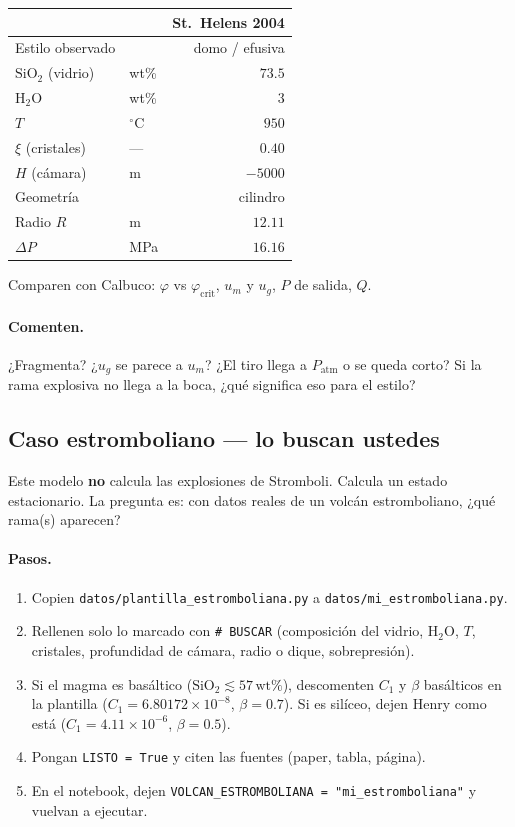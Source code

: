 \documentclass[11pt,a4paper]{article}
\begin{document}
\begin{center}
\small
\begin{tabular}{@{}llr@{}}
\toprule
& & St.\ Helens 2004 \\
\midrule
Estilo observado & & domo / efusiva \\
$\mathrm{SiO}_2$ (vidrio) & wt\% & $73.5$ \\
$\mathrm{H}_2\mathrm{O}$ & wt\% & $3$ \\
$T$ & $^\circ\mathrm{C}$ & $950$ \\
$\xi$ (cristales) & --- & $0.40$ \\
$H$ (cámara) & m & $-5000$ \\
Geometría & & cilindro \\
Radio $R$ & m & $12.11$ \\
$\Delta P$ & MPa & $16.16$ \\
\bottomrule
\end{tabular}
\end{center}

Comparen con Calbuco: $\varphi$ vs $\varphi_{\mathrm{crit}}$,
$u_m$ y $u_g$, $P$ de salida, $Q$.

\paragraph{Comenten.}
¿Fragmenta? ¿$u_g$ se parece a $u_m$?
¿El tiro llega a $P_{\mathrm{atm}}$ o se queda corto?
Si la rama explosiva no llega a la boca, ¿qué significa eso para el estilo?

\subsection{Caso estromboliano --- lo buscan ustedes}

Este modelo \textbf{no} calcula las explosiones de Stromboli.
Calcula un estado estacionario. La pregunta es: con datos reales de un
volcán estromboliano, ¿qué rama(s) aparecen?

\paragraph{Pasos.}
\begin{enumerate}
  \item Copien \texttt{datos/plantilla\_estromboliana.py} a
        \texttt{datos/mi\_estromboliana.py}.
  \item Rellenen solo lo marcado con \texttt{\# BUSCAR}
        (composición del vidrio, $\mathrm{H}_2\mathrm{O}$, $T$, cristales,
        profundidad de cámara, radio o dique, sobrepresión).
  \item Si el magma es basáltico ($\mathrm{SiO}_2\lesssim 57\,\mathrm{wt\%}$),
        descomenten $C_1$ y $\beta$ basálticos en la plantilla
        ($C_1=6.80172\times 10^{-8}$, $\beta=0.7$).
        Si es silíceo, dejen Henry como está
        ($C_1=4.11\times 10^{-6}$, $\beta=0.5$).
  \item Pongan \texttt{LISTO = True} y citen las fuentes (paper, tabla, página).
  \item En el notebook, dejen
        \texttt{VOLCAN\_ESTROMBOLIANA = "mi\_estromboliana"}
        y vuelvan a ejecutar.
\end{enumerate}
\end{document}
